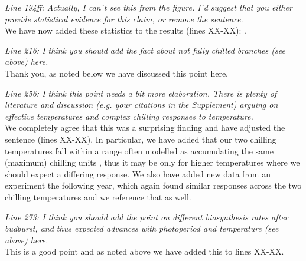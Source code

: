 \documentclass[11pt,a4paper]{article}
\begin{document}
\emph{Line 194ff: Actually, I can ́t see this from the figure. I ́d suggest that you either provide
statistical evidence for this claim, or remove the sentence.}\\

We have now added these statistics to the results (lines XX-XX): .

\emph{Line 216: I think you should add the fact about not fully chilled branches (see above) here.}\\

Thank you, as noted below we have discussed this point here. 

\emph{Line 256: I think this point needs a bit more elaboration. There is plenty of literature and
discussion (e.g. your citations in the Supplement) arguing on effective temperatures and
complex chilling responses to temperature.}\\

We completely agree that this was a surprising finding and have adjusted the sentence (lines XX-XX). In particular, we have added that our two chilling temperatures fall within a range often modelled as accumulating the same (maximum) chilling units \citep[for example, see][]{harrington2015}, thus it may be only for higher temperatures where we should expect a differing response. We also have added new data from an experiment the following year, which again found similar responses across the two chilling temperatures and we reference that as well. 

\emph{Line 273: I think you should add the point on different biosynthesis rates after budburst,
and thus expected advances with photoperiod and temperature (see above) here.}\\

This is a good point and as noted above we have added this to lines XX-XX. \\

\newpage

\end{document}
